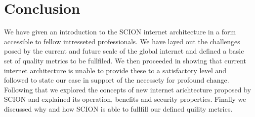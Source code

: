 \documentclass[../eva1_scion.tex]{subfiles}
\begin{document}
    \section{Conclusion}\label{ch:conlusion}
    We have given an introduction to the SCION internet architecture in a form accessible to fellow intresseted professionals. We have layed out the challenges posed by the current and future scale of the global internet and defined a basic set of quality metrics to be fullfiled. We then proceeded in showing that current internet architecture is unable to provide these to a satisfactory level and followed to state our case in support of the necessety for profound change. Following that we explored the concepts of new internet arichtecture proposed by SCION and explained its operation, benefits and security properties. Finally we discussed why and how SCION is able to fullfill our defined quility metrics.
\end{document}
